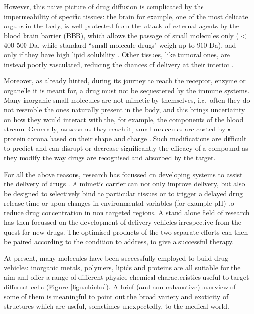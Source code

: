 However, this naive picture of drug diffusion is complicated by the impermeability of specific tissues: the brain for example, one of the most delicate organs in the body, is well protected from the attack of external agents by the blood brain barrier (BBB), which allows the passage of small molecules only ($<$ 400-500 Da, while standard ``small molecule drugs" weigh up to 900 Da), and only if they have high lipid solubility \cite{Pattni2015, Krol2012}. Other tissues, like tumoral ones, are instead poorly vasculated, reducing the chances of delivery at their interior \cite{Pattni2015}.

Moreover, as already hinted, during its journey to reach the receptor, enzyme or organelle it is meant for, a drug must not be sequestered by the immune systems. Many inorganic small molecules are not mimetic by themselves, i.e.\ often they do not resemble the ones naturally present in the body, and this brings uncertainty on how they would interact with the, for example, the components of the blood stream. Generally, as soon as they reach it, small molecules are coated by a protein corona based on their shape and charge \cite{Krol2012}. Such modifications are difficult to predict and can disrupt or decrease significantly the efficacy of a compound as they modify the way drugs are recognised and absorbed by the target. 

For all the above reasons, research has focussed on developing systems to assist the delivery of drugs \cite{Jain2016, Pattni2015, Mitragotri2014}. A mimetic carrier can not only improve delivery, but also be designed to selectively bind to particular tissues or to trigger a delayed drug release time or upon changes in environmental variables (for example pH) to reduce drug concentration in non targeted regions. A stand alone field of research has then focussed on the development of delivery vehicles irrespective from the quest for new drugs. The optimised products of the two separate efforts can then be paired according to the condition to address, to give a successful therapy.

At present, many molecules have been successfully employed to build drug vehicles: inorganic metals, polymers, lipids and proteins are all suitable for the aim and offer a range of different physico-chemical characteristics useful to target different cells \cite{Hughes2005} (Figure \ref{fig:vehicles}). A brief (and non exhaustive) overview of some of them is meaningful to point out the broad variety and exoticity of structures which are useful, sometimes unexpectedly, to the medical world.


